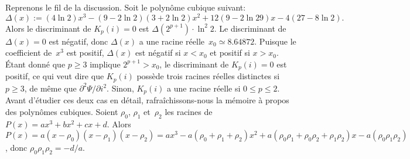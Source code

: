 Reprenons le fil de la discussion. Soit le polynôme cubique suivant:
\begin{equation*}
\Delta(x) \!:= (4\ln 2)x^3 - (9 - 2\ln 2)(3 + 2\ln 2)x^2 + 12(9 - 2\ln
29)x - 4(27 - 8\ln 2).
\end{equation*}
Alors le discriminant de \(K_p(i) = 0\) est \(\Delta(2^{p+1}) \cdot
\ln^2 2\). Le discriminant de \(\Delta(x) = 0 \) est négatif, donc
\(\Delta(x)\) a une racine réelle~\(x_0 \simeq 8.64872\). Puisque le
coefficient de~\(x^3\) est positif, \(\Delta(x)\) est négatif si \(x <
x_0\) et positif si \(x > x_0\). Étant donné que \(p \geqslant 3\)
implique \(2^{p+1} > x_0\), le discriminant de
\(K_p(i) = 0\) est positif, ce qui veut dire que \(K_p(i)\) possède
trois racines réelles distinctes si \(p \geqslant 3\), de même que
\(\partial^2\Psi/\partial i^2\). Sinon, \(K_p(i)\) a une racine réelle
si \(0 \leqslant p \leqslant 2\). Avant d'étudier ces deux cas en
détail, rafraîchissons-nous la mémoire à propos des polynômes
cubiques. Soient \(\rho_0\), \(\rho_1\) et~\(\rho_2\) les racines de
\(P(x) = ax^3 + bx^2 + cx + d\). Alors \(P(x) =
a(x-\rho_0)(x-\rho_1)(x-\rho_2) = ax^3 - a(\rho_0+\rho_1+\rho_2)x^2 +
a(\rho_0\rho_1 + \rho_0\rho_2 + \rho_1 \rho_2)x -
a(\rho_0\rho_1\rho_2)\), donc \(\rho_0\rho_1\rho_2 = -d/a\).
